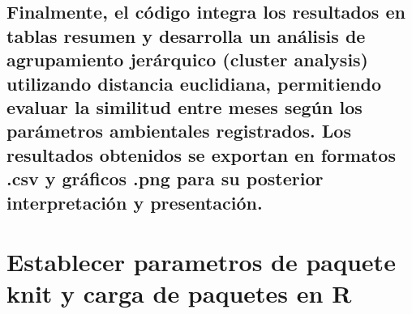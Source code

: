\documentclass[
]{article}
\begin{document}
\hypertarget{finalmente-el-cuxf3digo-integra-los-resultados-en-tablas-resumen-y-desarrolla-un-anuxe1lisis-de-agrupamiento-jeruxe1rquico-cluster-analysis-utilizando-distancia-euclidiana-permitiendo-evaluar-la-similitud-entre-meses-seguxfan-los-paruxe1metros-ambientales-registrados.-los-resultados-obtenidos-se-exportan-en-formatos-.csv-y-gruxe1ficos-.png-para-su-posterior-interpretaciuxf3n-y-presentaciuxf3n.}{%
\subsection{Finalmente, el código integra los resultados en tablas
resumen y desarrolla un análisis de agrupamiento jerárquico (cluster
analysis) utilizando distancia euclidiana, permitiendo evaluar la
similitud entre meses según los parámetros ambientales registrados. Los
resultados obtenidos se exportan en formatos .csv y gráficos .png para
su posterior interpretación y
presentación.}\label{finalmente-el-cuxf3digo-integra-los-resultados-en-tablas-resumen-y-desarrolla-un-anuxe1lisis-de-agrupamiento-jeruxe1rquico-cluster-analysis-utilizando-distancia-euclidiana-permitiendo-evaluar-la-similitud-entre-meses-seguxfan-los-paruxe1metros-ambientales-registrados.-los-resultados-obtenidos-se-exportan-en-formatos-.csv-y-gruxe1ficos-.png-para-su-posterior-interpretaciuxf3n-y-presentaciuxf3n.}}

\hypertarget{establecer-parametros-de-paquete-knit-y-carga-de-paquetes-en-r}{%
\section{Establecer parametros de paquete knit y carga de paquetes en
R}\label{establecer-parametros-de-paquete-knit-y-carga-de-paquetes-en-r}}
\end{document}
